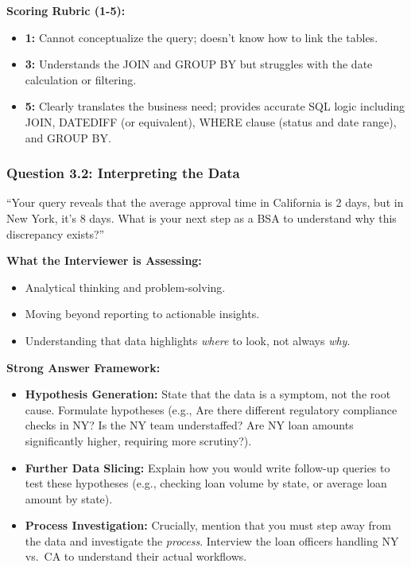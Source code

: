 \textbf{Scoring Rubric (1-5):}

\begin{itemize}
\tightlist
\item
  \textbf{1:} Cannot conceptualize the query; doesn't know how to link
  the tables.
\item
  \textbf{3:} Understands the JOIN and GROUP BY but struggles with the
  date calculation or filtering.
\item
  \textbf{5:} Clearly translates the business need; provides accurate
  SQL logic including JOIN, DATEDIFF (or equivalent), WHERE clause
  (status and date range), and GROUP BY.
\end{itemize}

\subsubsection{Question 3.2: Interpreting the
Data}\label{question-3.2-interpreting-the-data}

``Your query reveals that the average approval time in California is 2
days, but in New York, it's 8 days. What is your next step as a BSA to
understand why this discrepancy exists?''

\textbf{What the Interviewer is Assessing:}

\begin{itemize}
\tightlist
\item
  Analytical thinking and problem-solving.
\item
  Moving beyond reporting to actionable insights.
\item
  Understanding that data highlights \emph{where} to look, not always
  \emph{why}.
\end{itemize}

\textbf{Strong Answer Framework:}

\begin{itemize}
\tightlist
\item
  \textbf{Hypothesis Generation:} State that the data is a symptom, not
  the root cause. Formulate hypotheses (e.g., Are there different
  regulatory compliance checks in NY? Is the NY team understaffed? Are
  NY loan amounts significantly higher, requiring more scrutiny?).
\item
  \textbf{Further Data Slicing:} Explain how you would write follow-up
  queries to test these hypotheses (e.g., checking loan volume by state,
  or average loan amount by state).
\item
  \textbf{Process Investigation:} Crucially, mention that you must step
  away from the data and investigate the \emph{process}. Interview the
  loan officers handling NY vs.~CA to understand their actual workflows.
\end{itemize}

